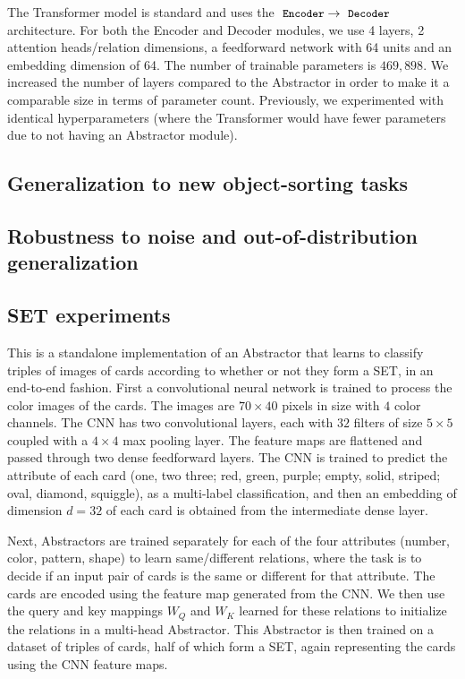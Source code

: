 The Transformer model is standard and uses the $\module{Encoder} \to \module{Decoder}$ architecture. For both the Encoder and Decoder modules, we use 4 layers, 2 attention heads/relation dimensions, a feedforward network with 64 units and an embedding dimension of 64. The number of trainable parameters is $469,898$. We increased the number of layers compared to the Abstractor in order to make it a comparable size in terms of parameter count. Previously, we experimented with identical hyperparameters (where the Transformer would have fewer parameters due to not having an Abstractor module).

\subsection{Generalization to new object-sorting tasks}

\subsection{Robustness to noise and out-of-distribution generalization}

\subsection{SET experiments}

This is a standalone implementation of an Abstractor that learns to classify triples of images of cards according 
to whether or not they form a SET, in an end-to-end fashion. First a convolutional neural network is trained to process the color images of the cards. The images are $70 \times 40$ pixels in size with $4$ color channels. The CNN has two convolutional layers, each with $32$ filters of size $5\times 5$ coupled with a $4\times 4$ max pooling layer. The feature maps are flattened and passed through two dense feedforward layers. The CNN is trained to predict the attribute of each card (one, two three; red, green, purple; empty, solid, striped; oval, diamond, squiggle), as a multi-label classification, and then an embedding of dimension $d=32$ of each card is obtained from the intermediate dense layer. 

Next, Abstractors are trained separately for each of the four attributes (number, color, pattern, shape) to learn same/different relations, where the task is to decide if an input pair of cards is the same or different for that attribute. The cards are encoded using the feature map generated from the CNN. We then use the query and key mappings $W_Q$ and $W_K$ learned for these relations to initialize the relations in a multi-head Abstractor. This Abstractor is then trained on a dataset of triples of cards, half of which form a SET, again representing the cards using the CNN feature maps.

